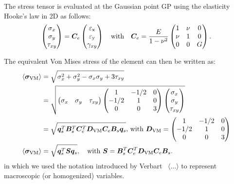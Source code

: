 The stress tensor is evaluated at the Gaussian point GP using the elasticity Hooke's law in 2D as follows: 
\begin{equation}
    \begin{pmatrix}
    \sigma_x \\
    \sigma_y \\
    \tau_{xy}
    \end{pmatrix}
    =\bm{C}_e
    \begin{pmatrix}
    \varepsilon_\text{x} \\
    \varepsilon_\text{y} \\
    \gamma_{xy}
    \end{pmatrix}
    \quad
    \text{with}
    \quad
    \bm{C}_e = \frac{E}{1-\nu^2}
    \begin{pmatrix}
    1   &   \nu &   0   \\
    \nu &   1   &   0   \\
    0   &   0   &   G
    \end{pmatrix}.
\end{equation}

The equivalent Von Mises stress of the element can then be written as:
\begin{align}
    \langle \bm{\sigma}_{\text{VM}} \rangle &= \sqrt{\sigma_x^2 + \sigma_y^2 - \sigma_x \sigma_y+3\tau_{xy}} \\
    &= \sqrt{
    \begin{pmatrix}
    \sigma_x & \sigma_y & \tau_{xy}
    \end{pmatrix}
    \begin{pmatrix}
    1       &   -1/2    &   0   \\
    -1/2    &   1       &   0   \\
    0       &   0       &   3
    \end{pmatrix}
    \begin{pmatrix}
    \sigma_x \\
    \sigma_y \\
    \tau_{xy}
    \end{pmatrix}} \\
    &= \sqrt{\bm{q}_s^T\bm{B}_s^T\bm{C}_e^T\bm{D}_{\text{VM}}\bm{C}_e\bm{B}_s\bm{q}_s}
    \textrm{,  with } \bm{D}_{\text{VM}} = 
    \begin{pmatrix}
    1       &   -1/2    &   0   \\
    -1/2    &   1       &   0   \\
    0       &   0       &   3
    \end{pmatrix} \\
    \langle \bm{\sigma}_{\text{VM}} \rangle &= \sqrt{\bm{q}_s^T\bm{S}\bm{q}_s}, \quad
    \textrm{with } \bm{S} = \bm{B}_s^T\bm{C}_e^T\bm{D}_{\text{VM}}\bm{C}_e\bm{B}_s.
    \label{eq:03_VM_calc}
\end{align}
in which we used the notation introduced by Verbart~ $\langle \dots \rangle$ to represent macroscopic (or homogenized) variables.
